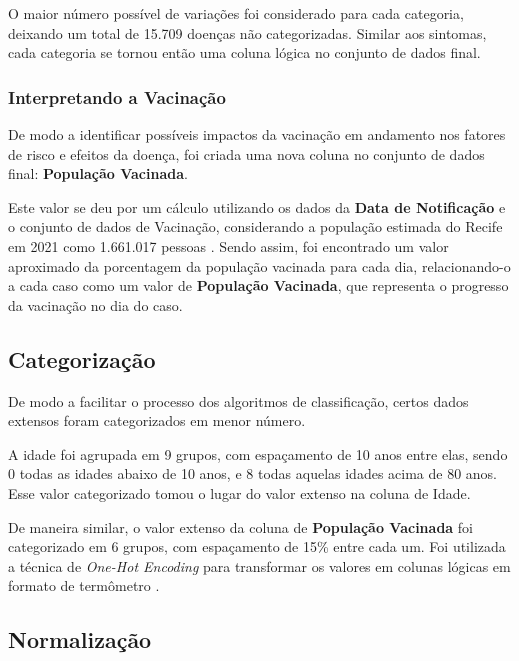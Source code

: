 

O maior número possível de variações foi considerado para cada categoria, deixando um total de 15.709 doenças não categorizadas. Similar aos sintomas, cada categoria se tornou então uma coluna lógica no conjunto de dados final.

\subsubsection{Interpretando a Vacinação}
\label{subsubsec:interpretando-vacinacao}

De modo a identificar possíveis impactos da vacinação em andamento nos fatores de risco e efeitos da doença, foi criada uma nova coluna no conjunto de dados final: \textbf{População Vacinada}.

Este valor se deu por um cálculo utilizando os dados da \textbf{Data de Notificação} e o conjunto de dados de Vacinação, considerando a população estimada do Recife em 2021 como 1.661.017 pessoas \cite{populacaorecife}. Sendo assim, foi encontrado um valor aproximado da porcentagem da população vacinada para cada dia, relacionando-o a cada caso como um valor de \textbf{População Vacinada}, que representa o progresso da vacinação no dia do caso.

\subsection{Categorização}
\label{subsec:categorizacao}

De modo a facilitar o processo dos algoritmos de classificação, certos dados extensos foram categorizados em menor número.

A idade foi agrupada em 9 grupos, com espaçamento de 10 anos entre elas, sendo 0 todas as idades abaixo de 10 anos, e 8 todas aquelas idades acima de 80 anos. Esse valor categorizado tomou o lugar do valor extenso na coluna de Idade.



De maneira similar, o valor extenso da coluna de \textbf{População Vacinada} foi categorizado em 6 grupos, com espaçamento de 15\% entre cada um. Foi utilizada a técnica de \textit{One-Hot Encoding} para transformar os valores em colunas lógicas em formato de termômetro \cite{onehot}.




\subsection{Normalização}
\label{subsec:normalizacao}

